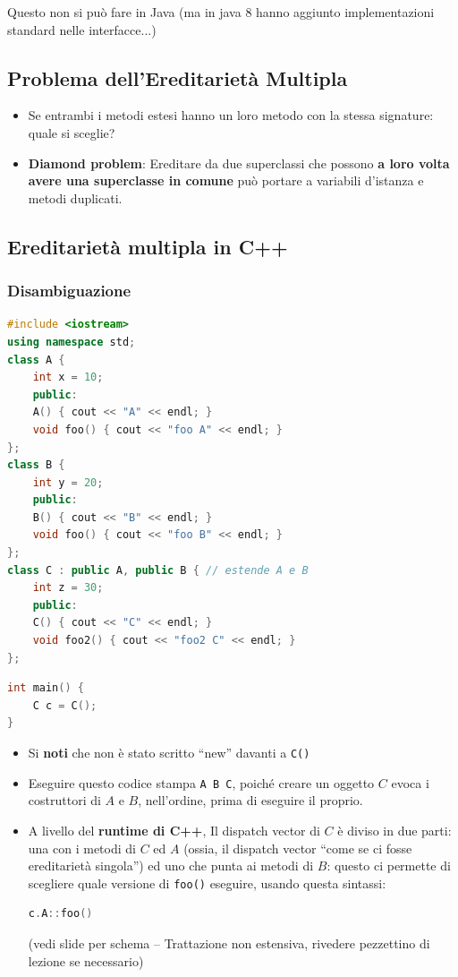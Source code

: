 \documentclass[a4paper,10pt]{article}
\begin{document}
Questo non si può fare in Java (ma in java 8 hanno aggiunto implementazioni standard nelle interfacce...)
\subsection{Problema dell'Ereditarietà Multipla}
\begin{itemize}
 \item Se entrambi i metodi estesi hanno un loro metodo con la stessa signature: quale si sceglie? 
 \item \textbf{Diamond problem}: Ereditare da due superclassi che possono \textbf{a loro volta avere una superclasse in comune} può portare a variabili d'istanza e metodi duplicati.
\end{itemize}
\subsection{Ereditarietà multipla in C++}
\subsubsection{Disambiguazione}
\begin{lstlisting}[language = c++]
#include <iostream>
using namespace std;
class A {
    int x = 10;
    public:
    A() { cout << "A" << endl; }
    void foo() { cout << "foo A" << endl; }
};
class B {
    int y = 20;
    public:
    B() { cout << "B" << endl; }
    void foo() { cout << "foo B" << endl; }
};
class C : public A, public B { // estende A e B
    int z = 30;
    public:
    C() { cout << "C" << endl; }
    void foo2() { cout << "foo2 C" << endl; }
};
\end{lstlisting}

\begin{lstlisting}[language=c++]
int main() {
    C c = C();
}
\end{lstlisting}

\begin{itemize}
 \item Si \textbf{noti} che non è stato scritto ``new'' davanti a \texttt{C()} 
 \item Eseguire questo codice stampa \texttt{A B C}, poiché creare un oggetto $C$ evoca i costruttori di $A$ e $B$, nell'ordine, prima di eseguire il proprio.
 \item A livello del \textbf{runtime di C++}, Il dispatch vector di $C$ è diviso in due parti: una con i metodi di $C$ ed $A$ (ossia, il dispatch vector ``come se ci fosse ereditarietà singola'') ed uno che punta ai metodi di $B$: questo ci permette di scegliere quale versione di \texttt{foo()} eseguire, usando questa sintassi:
 \begin{lstlisting}[language = c++]
c.A::foo()\end{lstlisting}
(vedi slide per schema -- Trattazione non estensiva, rivedere pezzettino di lezione se necessario)
 
\end{itemize}
\end{document}

